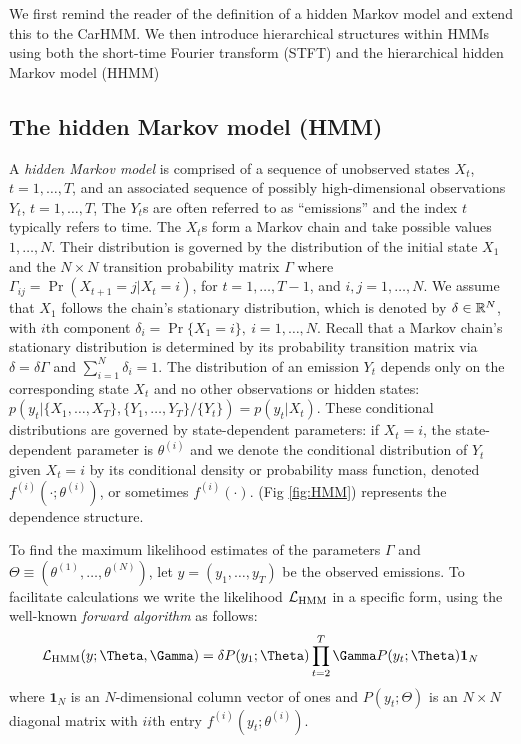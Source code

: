 %

We first remind the reader of the definition of a hidden Markov model and extend this to the CarHMM. We then introduce hierarchical structures within HMMs using both the short-time Fourier transform (STFT) and the hierarchical hidden Markov model (HHMM)

\subsection{The hidden Markov model (HMM)}

A \textit{hidden Markov model}  is comprised of a sequence of  unobserved states $X_t$, $t = 1, \ldots, T$, and an associated sequence of  possibly high-dimensional observations $Y_t$, $t = 1, \ldots, T$,
The $Y_t$s are often referred to as ``emissions'' and the index $t$ typically refers to time. 
The $X_t$s form a Markov chain and take possible values $1, \ldots, N$. Their distribution is governed by the distribution of the initial state $X_1$ and the $N \times N$ transition probability matrix $\Gamma$ where $\Gamma_{ij} = \Pr(X_{t+1} = j | X_t = i)$, for $t=1,\ldots, T-1$, and $i, j = 1,\ldots, N$. 
%
We assume that $X_1$ follows the chain's stationary distribution, which is denoted by $\delta \in \mathbb{R}^N$, with $i$th component
$\delta_i = \Pr\{X_1 = i\},~ i = 1,\ldots,N.$
%
Recall that a Markov chain's stationary distribution is determined by its probability transition matrix via $\delta = \delta \Gamma$ and $\sum_{i=1}^N \delta_i = 1$.
%
The distribution of an emission $Y_t$ depends only on the corresponding state $X_t$ and no other observations or hidden states: $p\left(y_t|\{X_1,\ldots, X_T\},\{Y_1,\ldots, Y_T\}/ \{Y_t\}\right) = p(y_t|X_t)$.
%
These conditional distributions are governed by state-dependent parameters: if $X_t = i$, the state-dependent parameter is $\theta^{(i)}$ and we denote the conditional distribution of $Y_t$ given $X_t=i$ by its conditional density or probability mass function, denoted $f^{(i)}(\cdot ; \theta^{(i)})$, or sometimes  $f^{(i)}(\cdot)$.
%
(Fig \ref{fig:HMM}) represents the dependence structure.

To find the maximum likelihood estimates of the parameters $\Gamma$ and $\Theta \equiv (\theta^{(1)},\ldots,\theta^{(N)})$, let $y = (y_1,\ldots,y_T)$ be the observed emissions. 
 To facilitate calculations we write the likelihood $\mathcal{L}_{\text{HMM}}$ in a specific form, using the  well-known \textit{forward algorithm} \citep{Zucchini:2016} as follows:
%
$$\calL_{\text{HMM}}(y;\Theta,\Gamma) = \delta P(y_1;\Theta) \prod_{t=2}^T \Gamma P(y_t;\Theta) \mathbf{1}_N$$
%
where $\mathbf{1}_N$ is an $N$-dimensional column vector of ones and
%
$P(y_t;\Theta)$ is an $N \times N$ diagonal matrix with $ii$th entry  $f^{(i)}(y_t; \theta^{(i)})$.
%

